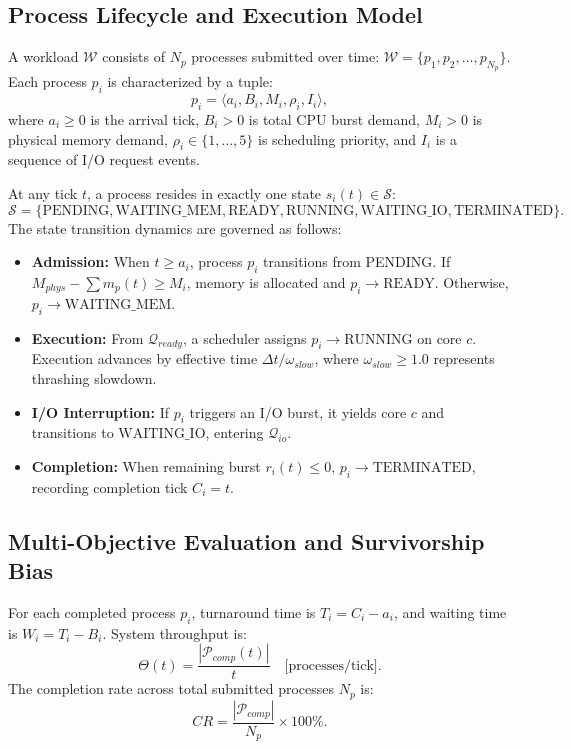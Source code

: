 \documentclass[conference]{IEEEtran}
\begin{document}
\subsection{Process Lifecycle and Execution Model}
A workload $\mathcal{W}$ consists of $N_p$ processes submitted over time: $\mathcal{W} = \{p_1, p_2, \dots, p_{N_p}\}$. Each process $p_i$ is characterized by a tuple:
\begin{equation}
    p_i = \langle a_i, B_i, M_i, \rho_i, I_i \rangle,
\end{equation}
where $a_i \ge 0$ is the arrival tick, $B_i > 0$ is total CPU burst demand, $M_i > 0$ is physical memory demand, $\rho_i \in \{1, \dots, 5\}$ is scheduling priority, and $I_i$ is a sequence of I/O request events.

At any tick $t$, a process resides in exactly one state $s_i(t) \in \mathcal{S}$:
\begin{equation}
    \mathcal{S} = \{\text{PENDING}, \text{WAITING\_MEM}, \text{READY}, \text{RUNNING}, \text{WAITING\_IO}, \text{TERMINATED}\}.
\end{equation}
The state transition dynamics are governed as follows:
\begin{itemize}
    \item \textbf{Admission:} When $t \ge a_i$, process $p_i$ transitions from PENDING. If $M_{phys} - \sum m_p(t) \ge M_i$, memory is allocated and $p_i \to \text{READY}$. Otherwise, $p_i \to \text{WAITING\_MEM}$.
    \item \textbf{Execution:} From $\mathcal{Q}_{ready}$, a scheduler assigns $p_i \to \text{RUNNING}$ on core $c$. Execution advances by effective time $\Delta t / \omega_{slow}$, where $\omega_{slow} \ge 1.0$ represents thrashing slowdown.
    \item \textbf{I/O Interruption:} If $p_i$ triggers an I/O burst, it yields core $c$ and transitions to $\text{WAITING\_IO}$, entering $\mathcal{Q}_{io}$.
    \item \textbf{Completion:} When remaining burst $r_i(t) \le 0$, $p_i \to \text{TERMINATED}$, recording completion tick $C_i = t$.
\end{itemize}

\subsection{Multi-Objective Evaluation and Survivorship Bias}
For each completed process $p_i$, turnaround time is $T_i = C_i - a_i$, and waiting time is $W_i = T_i - B_i$. System throughput is:
\begin{equation}
    \Theta(t) = \frac{|\mathcal{P}_{comp}(t)|}{t} \quad \text{[processes/tick]}.
\end{equation}
The completion rate across total submitted processes $N_p$ is:
\begin{equation}
    CR = \frac{|\mathcal{P}_{comp}|}{N_p} \times 100\%.
\end{equation}
\end{document}
